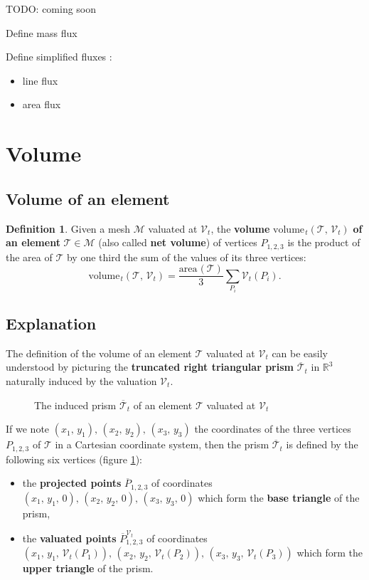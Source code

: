 \documentclass{article}
\theoremstyle{definition}
\newtheorem{defn}{Definition}
\newcommand{\RR}{\mathbb{R}}
\newcommand{\MM}{\mathcal{M}}
\newcommand{\VV}{\mathcal{V}}
\newcommand{\TT}{\mathcal{T}}
\newcommand{\area}{\mathrm{area}\hspace{1pt}}
\newcommand{\vol}{\mathrm{volume\hspace{1pt}}}
\begin{document}
TODO: coming soon

Define mass flux

Define simplified fluxes :
\begin{itemize}
  \item line flux
  \item area flux
\end{itemize}


\section{Volume}

\subsection{Volume of an element}
\begin{defn}
Given a mesh $\MM$ valuated at $\VV_t$, the \textbf{volume} $\vol_t(\TT,\,\VV_t)$ \textbf{of an element} $\TT\in\MM$ (also called \textbf{net volume}) of vertices $P_{1,2,3}$ is the product of the area of $\TT$ by one third the sum of the values of its three vertices:
\[\vol_t(\TT,\,\VV_t) = \frac{\area(\TT)}{3}
\sum_{P_i} \VV_t(P_i). \]
\label{def:volumeT}\end{defn}


\subsection{Explanation}
The definition of the volume of an element $\TT$ valuated at $\VV_t$ can be easily understood by picturing the \textbf{truncated right triangular prism} $\overline{\TT}_t$ in $\RR^3$ naturally induced by the valuation $\VV_t$.

\begin{figure}[ht!]
\centering 
  \caption{The induced prism $\overline{\TT}_t$ of an element $\TT$ valuated at $\VV_t$}
  \label{fig:prism}
\end{figure}

If we note $(x_1,\,y_1),\,(x_2,\,y_2),\,(x_3,\,y_3)$ the coordinates of the three vertices $P_{1,2,3}$ of $\TT$ in a Cartesian coordinate system, then the prism $\overline{\TT}_t$ is defined by the following six vertices (figure \ref{fig:prism}):
\begin{itemize}
\item the \textbf{projected points} $\overline{P}_{1,2,3}$ of coordinates $(x_1,\,y_1,\,0),\,(x_2,\,y_2,\,0),\,(x_3,\,y_3,\,0)$ which form the \textbf{base triangle} of the prism,
\item the \textbf{valuated points} $\overline{P}_{1,2,3}^{\VV_t}$ of coordinates $(x_1,\,y_1,\,\VV_t(P_1)),\,(x_2,\,y_2,\,\VV_t(P_2)),\,(x_3,\,y_3,\,\VV_t(P_3))$ which form the \textbf{upper triangle} of the prism.
\end{itemize}
\end{document}
